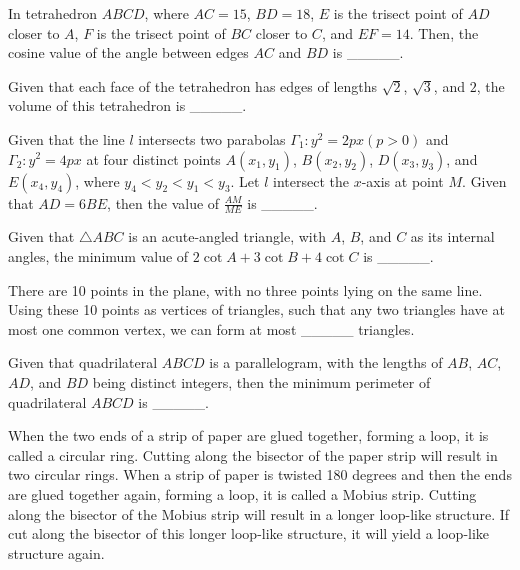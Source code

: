 \begin{problem}\label{AIChallenge_Geo19}
In tetrahedron $ABCD$, where $AC=15$, $BD=18$, $E$ is the trisect point of $AD$ closer to $A$, $F$ is the trisect point of $BC$ closer to $C$, and $EF=14$. Then, the cosine value of the angle between edges $AC$ and $BD$ is \_\_\_\_\_.
\end{problem}


\begin{problem}\label{AIChallenge_Geo20}
Given that each face of the tetrahedron has edges of lengths $\sqrt{2}$, $\sqrt{3}$, and $2$, the volume of this tetrahedron is \_\_\_\_\_.
\end{problem}



\begin{problem}\label{AIChallenge_Geo21}
Given that the line $l$ intersects two parabolas $\Gamma_{1}: y^{2}=2px (p>0)$ and $\Gamma_{2}: y^{2}=4px$ at four distinct points $A\left(x_{1}, y_{1}\right)$, $B\left(x_{2}, y_{2}\right)$, $D\left(x_{3}, y_{3}\right)$, and $E\left(x_{4}, y_{4}\right)$, where $y_{4}<y_{2}<y_{1}<y_{3}$. 
Let $l$ intersect the $x$-axis at point $M$. Given that $AD = 6 BE$, then the value of $\frac{AM}{ME}$ is \_\_\_\_\_.
\end{problem}


\begin{problem}\label{AIChallenge_Geo22}
Given that $\triangle ABC$ is an acute-angled triangle, with $A$, $B$, and $C$ as its internal angles, the minimum value of $2 \cot A+3 \cot B+4 \cot C$ is \_\_\_\_\_.
\end{problem}


\begin{problem}\label{AIChallenge_Geo23}
There are 10 points in the plane, with no three points lying on the same line. Using these 10 points as vertices of triangles, such that any two triangles have at most one common vertex, we can form at most \_\_\_\_\_ triangles.
\end{problem}


\begin{problem}\label{AIChallenge_Geo24}
Given that quadrilateral $ABCD$ is a parallelogram, with the lengths of $AB$, $AC$, $AD$, and $BD$ being distinct integers, then the minimum perimeter of quadrilateral $ABCD$ is \_\_\_\_\_.
\end{problem}


\begin{problem}\label{AIChallenge_Geo25}
When the two ends of a strip of paper are glued together, forming a loop, it is called a circular ring. Cutting along the bisector of the paper strip will result in two circular rings. When a strip of paper is twisted 180 degrees and then the ends are glued together again, forming a loop, it is called a Mobius strip. Cutting along the bisector of the Mobius strip will result in a longer loop-like structure. If cut along the bisector of this longer loop-like structure, it will yield a loop-like structure again.
\end{problem}


